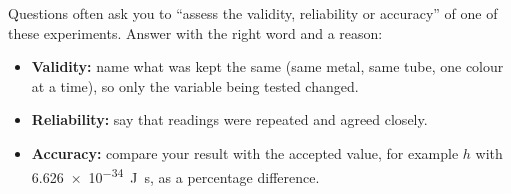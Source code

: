 \begin{examtip}
Questions often ask you to ``assess the validity, reliability or accuracy'' of one of
these experiments. Answer with the right word and a reason:
\begin{itemize}
  \item \textbf{Validity:} name what was kept the same (same metal, same tube, one
        colour at a time), so only the variable being tested changed.
  \item \textbf{Reliability:} say that readings were repeated and agreed closely.
  \item \textbf{Accuracy:} compare your result with the accepted value, for example
        $h$ with \qty{6.626e-34}{J.s}, as a percentage difference.
\end{itemize}
\end{examtip}
